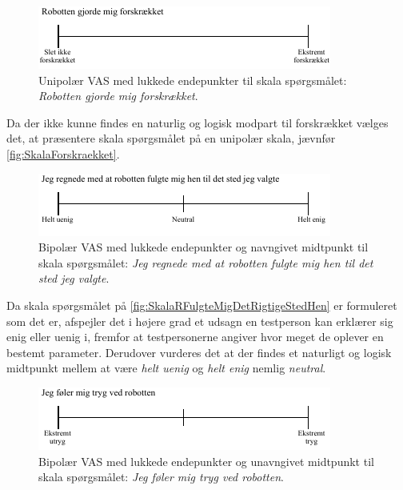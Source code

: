 %
\begin{figure}[H]
\centering
\includegraphics[width =\textwidth]{Figure/UdvalgteSkalaer/Forskraekket} 
\caption{Unipolær VAS med lukkede endepunkter til skala spørgsmålet: \textit{Robotten gjorde mig forskrækket}.}
\label{fig:SkalaForskraekket}
\end{figure}
\noindent
%
Da der ikke kunne findes en naturlig og logisk modpart til forskrækket vælges det, at præsentere skala spørgsmålet på en unipolær skala, jævnfør \autoref{fig:SkalaForskraekket}. 
%
\begin{figure}[H]
\centering
\includegraphics[width =\textwidth]{Figure/UdvalgteSkalaer/RobottenFulgteMigDetRigtigeStedHen} 
\caption{Bipolær VAS med lukkede endepunkter og navngivet midtpunkt til skala spørgsmålet: \textit{Jeg regnede med at robotten fulgte mig hen til det sted jeg valgte}.}
\label{fig:SkalaRFulgteMigDetRigtigeStedHen}
\end{figure}
\noindent
%
Da skala spørgsmålet på \autoref{fig:SkalaRFulgteMigDetRigtigeStedHen} er formuleret som det er, afspejler det i højere grad et udsagn en testperson kan erklærer sig enig eller uenig i, fremfor at testpersonerne angiver hvor meget de oplever en bestemt parameter. Derudover vurderes det at der findes et naturligt og logisk midtpunkt mellem at være \textit{helt uenig} og \textit{helt enig} nemlig \textit{neutral}.  
%
\begin{figure}[H]
\centering
\includegraphics[width =\textwidth]{Figure/UdvalgteSkalaer/TrygVedR} 
\caption{Bipolær VAS med lukkede endepunkter og unavngivet midtpunkt til skala spørgsmålet: \textit{Jeg føler mig tryg ved robotten}.}
\label{fig:SkalaTrygVedR}
\end{figure}
